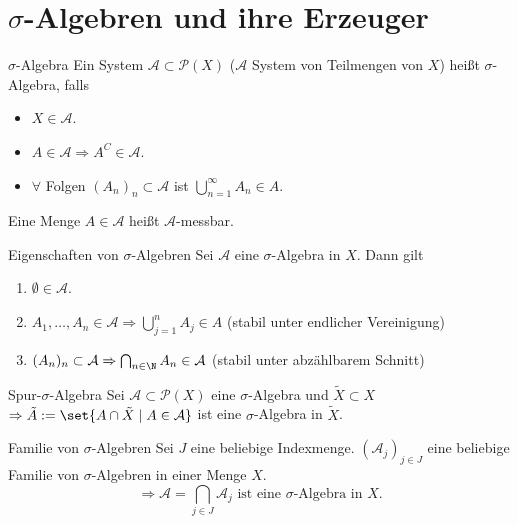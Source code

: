 \section*{\(\sigma\)-Algebren und ihre Erzeuger}

\begin{karte}{\(\sigma\)-Algebra}
	Ein System \(\mathcal{A} \subset \mathcal{P}(X)\) (\(\mathcal{A}\) System von Teilmengen von \(X\)) 
	heißt \(\sigma\)-Algebra, falls 
	\begin{itemize}
		\item \( X \in \mathcal{A} \).
		\item \( A \in \mathcal{A} \Rightarrow A^C \in \mathcal{A} \).
		\item \(\forall\) Folgen \( (A_n)_n \subset \mathcal{A} \) ist 
		\( \bigcup_{n=1}^\infty A_n \in A \). 
	\end{itemize}
	Eine Menge \(A \in \mathcal{A}\) heißt \(\mathcal{A}\)-messbar.
\end{karte}

\begin{karte}{Eigenschaften von \(\sigma\)-Algebren}
	Sei \(\mathcal{A}\) eine \(\sigma\)-Algebra in \(X\). Dann gilt 
	\begin{enumerate}
		\item \(\emptyset \in \mathcal{A}\).
		\item \( A_1, \ldots, A_n \in \mathcal{A}\Rightarrow \bigcup_{j=1}^n A_j \in A \) (stabil unter endlicher Vereinigung)
		\item \( (A_n)_n \subset \mathcal{A} \Rightarrow \bigcap_{n\in\N} A_n \in \mathcal{A} \) (stabil unter abzählbarem Schnitt)
	\end{enumerate}
\end{karte}

\begin{karte}{Spur-\(\sigma\)-Algebra}
	Sei \(\mathcal{A} \subset \mathcal{P}(X)\) eine \(\sigma\)-Algebra und \(\tilde{X} \subset X\) 
	\( \Rightarrow \tilde{A} := \set{ A \cap \tilde{X} \;\vert\; A \in \mathcal{A} } \) ist eine 
	\(\sigma\)-Algebra in \(\tilde{X}\).
\end{karte}

\begin{karte}{Familie von \(\sigma\)-Algebren}
	Sei \(J\) eine beliebige Indexmenge. 
	\((\mathcal{A}_j)_{j\in J}\) eine beliebige Familie von 
	\(\sigma\)-Algebren in einer Menge \(X\).
	\[ \Rightarrow \mathcal{A} = \bigcap_{j\in J} \mathcal{A}_j \text{ ist eine \(\sigma\)-Algebra in } X. \]
\end{karte}

